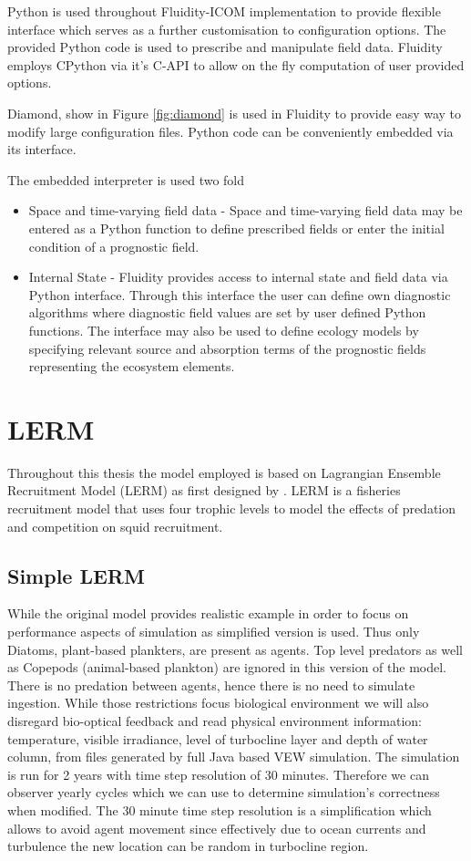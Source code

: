 \documentclass[12pt, a4paper]{report}
\begin{document}
Python is used throughout Fluidity-ICOM implementation to provide flexible
interface which serves as a further customisation to configuration options.
The provided Python code is used to prescribe and manipulate field data.
Fluidity employs CPython via it's C-API to allow on the fly computation
of user provided options.

Diamond, show in Figure \ref{fig:diamond} is used in Fluidity to provide easy way to modify large
configuration files. Python code can be conveniently embedded via its
interface.

The embedded interpreter is used two fold
\begin{itemize}
  \item Space and time-varying field data - Space and time-varying field
data may be entered as a Python function to define prescribed fields
or enter the initial condition of a prognostic field.
  \item Internal State - Fluidity provides access to internal state
  and field data via Python interface. Through this interface
  the user can define own diagnostic algorithms where diagnostic
  field values are set by user defined Python functions. The interface
  may also be used to define ecology models by specifying relevant
  source and absorption terms of the prognostic fields representing
  the ecosystem elements.
\end{itemize}

\section{LERM}\label{sec:lerm}
Throughout this thesis the model employed is based on
Lagrangian Ensemble Recruitment Model (LERM) as first designed
by \cite{FisheriesRecruitment}. LERM is a
fisheries recruitment model that uses four trophic levels to
model the effects of predation and competition on squid recruitment.

\subsection{Simple LERM}\label{subsec:lerm-simp}
While the original model provides realistic example in order
to focus on performance aspects of simulation as simplified version
is used. Thus only Diatoms, plant-based plankters, are present
as agents. Top level predators as well as Copepods (animal-based plankton)
are ignored in this version of the model. There is no predation
between agents, hence there is no need to simulate ingestion.
While those restrictions focus biological environment we will also
disregard bio-optical feedback and read physical environment
information: temperature, visible irradiance, level of turbocline
layer and depth of water column, from files generated by
full Java based VEW simulation. The simulation is run for 2 years
with time step resolution of 30 minutes. Therefore we can observer
yearly cycles which we can use to determine simulation's correctness
when modified. The 30 minute time step resolution is a simplification
which allows to avoid agent movement since effectively due to ocean
currents and turbulence the new location can be random in turbocline
region.
\end{document}
